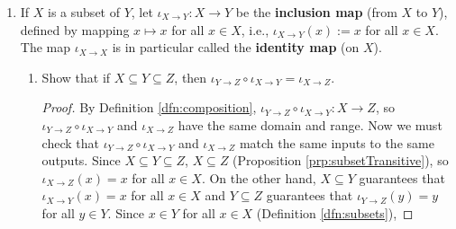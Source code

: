 \documentclass[../main.tex]{subfiles}
\begin{document}
\begin{enumerate}[ref={\thesection.\arabic*}]
    \begin{proof}
        By Definition \ref{dfn:bijective}, $f$ and $g$ are both both injective and surjective. Thus, by consecutive applications of Exercise \ref{exr:3.3.2}, $g\circ f$ is both injective and surjective. Thus, by Definition \ref{dfn:bijective} again, $g\circ f$ is bijective.\par
        To prove that $(g\circ f)^{-1}=f^{-1}\circ g^{-1}$, Definition \ref{dfn:functionEquality} tells us that it will suffice to show that $(g\circ f)^{-1}$ and $f^{-1}\circ g^{-1}$ have the same domain and range, and $(g\circ f)^{-1}(z)=(f^{-1}\circ g^{-1})(z)$ for all $z\in Z$. Since $f:X\to Y$ and $g:Y\to Z$, by Definition \ref{dfn:composition}, we have $g\circ f:X\to Z$. Thus, the inverse $(g\circ f)^{-1}:Z\to X$. Similarly, since $g^{-1}:Z\to Y$ and $f^{-1}:Y\to X$, by Definition \ref{dfn:composition}, $f^{-1}\circ g^{-1}:Z\to X$. Thus, $(g\circ f)^{-1}$ and $f^{-1}\circ g^{-1}$ have the same domain and range. As to the other part of the question, let $(f^{-1}\circ g^{-1})(z)=x$. Then
        \begin{align*}
            (f^{-1}\circ g^{-1})(z)=x &\Longrightarrow f^{-1}(g^{-1}(z))=x \tag*{Definition \ref{dfn:composition}}\\
            &\Longrightarrow g^{-1}(z)=f(x) \tag*{Definition of inverse}\\
            &\Longrightarrow z=g(f(x)) \tag*{Definition of inverse}\\
            &\Longrightarrow z=(g\circ f)(x) \tag*{Definition \ref{dfn:composition}}\\
            &\Longrightarrow (g\circ f)^{-1}(z)=x \tag*{Definition of inverse}
        \end{align*}
        so by transitivity we have $(g\circ f)^{-1}(z)=(f^{-1}\circ g^{-1})(z)$, as desired.
    \end{proof}
    \item \label{exr:3.3.8}If $X$ is a subset of $Y$, let $\iota_{X\to Y}:X\to Y$ be the \textbf{inclusion map} (from $X$ to $Y$), defined by mapping $x\mapsto x$ for all $x\in X$, i.e., $\iota_{X\to Y}(x):=x$ for all $x\in X$. The map $\iota_{X\to X}$ is in particular called the \textbf{identity map} (on $X$).
    \begin{enumerate}
        \item Show that if $X\subseteq Y\subseteq Z$, then $\iota_{Y\to Z}\circ\iota_{X\to Y}=\iota_{X\to Z}$.
        \begin{proof}
            By Definition \ref{dfn:composition}, $\iota_{Y\to Z}\circ\iota_{X\to Y}:X\to Z$, so $\iota_{Y\to Z}\circ\iota_{X\to Y}$ and $\iota_{X\to Z}$ have the same domain and range. Now we must check that $\iota_{Y\to Z}\circ\iota_{X\to Y}$ and $\iota_{X\to Z}$ match the same inputs to the same outputs. Since $X\subseteq Y\subseteq Z$, $X\subseteq Z$ (Proposition \ref{prp:subsetTransitive}), so $\iota_{X\to Z}(x)=x$ for all $x\in X$. On the other hand, $X\subseteq Y$ guarantees that $\iota_{X\to Y}(x)=x$ for all $x\in X$ and $Y\subseteq Z$ guarantees that $\iota_{Y\to Z}(y)=y$ for all $y\in Y$. Since $x\in Y$ for all $x\in X$ (Definition \ref{dfn:subsets}),

\end{proof}
\end{enumerate}
\end{enumerate}
\end{document}
